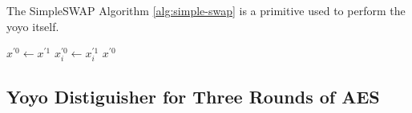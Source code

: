 \documentclass[notheorems]{beamer}
\theoremstyle{definition}
\theoremstyle{example}
\begin{document}
    \begin{frame}{The SimpleSWAP Algorithm}
        \cref{alg:simple-swap} is a primitive used to perform the yoyo itself.
        \begin{algorithm}[H]
            \caption{Swaps the first word where texts are different and returns one word.}
            \label{alg:simple-swap}
            \begin{algorithmic}[1]
                 
                    \State \(x^{\prime 0} \gets x^{\prime 1}\)
                            \State \(x_i^{\prime 0} \gets x_i^{\prime 1}\)
                            \State \Return \(x^{\prime 0}\)
                        \EndIf
                    \EndFor
                \EndFunction
            \end{algorithmic}
        \end{algorithm}
    \end{frame}

    \subsection{Yoyo Distiguisher for Three Rounds of AES}
    \label{subsec:aes-3-rounds}
\end{document}
